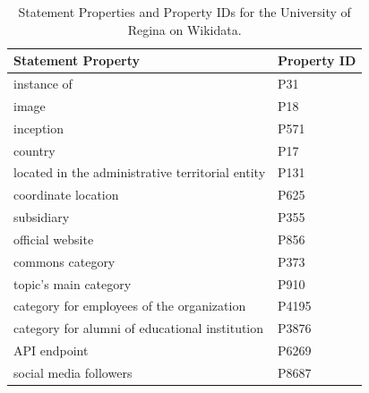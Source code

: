 \begin{doublespace}
\begin{table}[h!]

		\centering
		
		\caption{Statement Properties and Property IDs for the University of Regina on Wikidata.\label{uofr-statement-properties-and-id}}
        
        \begin{tabular}{|l|l|} \hline 
             Statement Property \ & Property ID \\ \hline
             instance of & P31\\ \hline
             image & P18\\ \hline
             inception & P571\\ \hline
             country & P17\\ \hline
             located in the administrative territorial entity & P131\\ \hline
             coordinate location & P625\\ \hline
             subsidiary & P355\\ \hline
             official website & P856\\ \hline
             commons category & P373\\ \hline
             topic's main category & P910\\ \hline
             category for employees of the organization & P4195\\ \hline
             category for alumni of educational institution & P3876\\ \hline
             API endpoint & P6269\\ \hline
             social media followers & P8687\\ \hline
        \end{tabular}
\end{table}
   
\begin{table}[h!]
	\centering
	
	\caption{Identifier Properties and Property IDs for the University of Regina on Wikidata.}
    \label{uofr-identifier-properties-and-id}
   

\end{table}
\end{doublespace}
